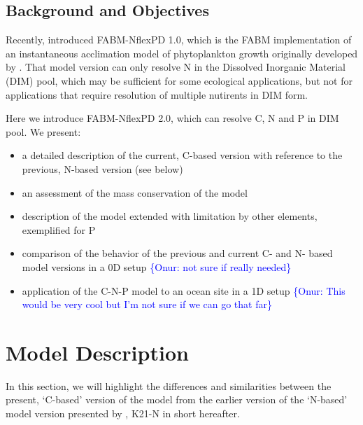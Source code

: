 \documentclass[gmd, manuscript]{copernicus}
\newcommand{\onur}[1]{\textcolor{blue}{\{Onur: #1\}}}
\begin{document}
\subsection{Background and Objectives}
Recently, \citet{Kerimoglu2021} introduced FABM-NflexPD 1.0, which is the FABM \citep[Framework for Aquatic Biogeochemical Models][]{Bruggeman2014} implementation of an instantaneous acclimation model of phytoplankton growth originally developed by \citet{Smith2016}. That model version can only resolve N in the Dissolved Inorganic Material (DIM) pool, which may be sufficient for some ecological applications, but not for applications that require resolution of multiple nutirents in DIM form.

Here we introduce FABM-NflexPD 2.0, which can resolve C, N and P in DIM pool. We present:
\begin{itemize}
 \item a detailed description of the current, C-based version with reference to the previous, N-based version (see below)
 \item an assessment of the mass conservation of the model
 \item description of the model extended with limitation by other elements, exemplified for P
 \item comparison of the behavior of the previous and current C- and N- based model versions in a 0D setup \onur{not sure if really needed} %
 \item application of the C-N-P model to an ocean site in a 1D setup \onur{This would be very cool but I'm not sure if we can go that far}
\end{itemize}


\section{Model Description}
In this section, we will highlight the differences and similarities between the present, `C-based' version of the model from the earlier version of the `N-based' model version presented by \citet{Kerimoglu2021}, K21-N in short hereafter.
\end{document}

